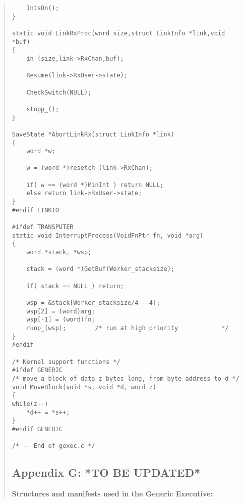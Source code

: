 \begin {quote}
\begin{verbatim}
    IntsOn();
}

static void LinkRxProc(word size,struct LinkInfo *link,void *buf)
{
    in_(size,link->RxChan,buf);
    
    Resume(link->RxUser->state);

    CheckSwitch(NULL);
    
    stopp_();
}

SaveState *AbortLinkRx(struct LinkInfo *link)
{
    word *w;
    
    w = (word *)resetch_(link->RxChan);

    if( w == (word *)MinInt ) return NULL;
    else return link->RxUser->state;
}
#endif LINKIO

#ifdef TRANSPUTER
static void InterruptProcess(VoidFnPtr fn, void *arg)
{
    word *stack, *wsp;
    
    stack = (word *)GetBuf(Worker_stacksize);
    
    if( stack == NULL ) return;
    
    wsp = &stack[Worker_stacksize/4 - 4];
    wsp[2] = (word)arg;
    wsp[-1] = (word)fn;
    runp_(wsp);        /* run at high priority            */
}
#endif

/* Kernel support functions */
#ifdef GENERIC
/* move a block of data z bytes long, from byte address to d */
void MoveBlock(void *s, void *d, word z)
{
while(z--)
    *d++ = *s++;
}
#endif GENERIC

/* -- End of gexec.c */
\end{verbatim}
\normalsize
\vfill
\newpage

\subsection*{Appendix G: *TO BE UPDATED*}

{\bf Structures and manifests used in the Generic Executive:}


\end{quote}
